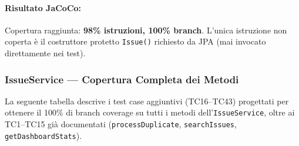 ﻿\documentclass[11pt,a4paper]{article}
\begin{document}
\paragraph{Risultato JaCoCo:} Copertura raggiunta: \textbf{98\% istruzioni, 100\% branch}. L'unica istruzione non coperta è il costruttore protetto \texttt{Issue()} richiesto da JPA (mai invocato direttamente nei test).

\clearpage

\subsubsection{IssueService --- Copertura Completa dei Metodi}

La seguente tabella descrive i test case aggiuntivi (TC16--TC43) progettati per ottenere il 100\% di branch coverage su tutti i metodi dell'\texttt{IssueService}, oltre ai TC1--TC15 già documentati (\texttt{processDuplicate}, \texttt{searchIssues}, \texttt{getDashboardStats}).\\
\end{document}

